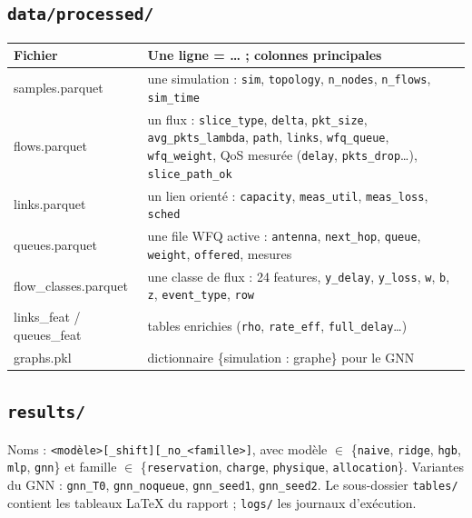 \documentclass[11pt,a4paper]{article}
\newcommand{\f}[1]{\texttt{#1}}
\begin{document}
\subsection{\texttt{data/processed/}}
\begin{tabularx}{\linewidth}{@{}>{\ttfamily}p{4.2cm}X@{}}
\toprule
\normalfont\bfseries Fichier & \bfseries Une ligne = … ; colonnes principales\\
\midrule
samples.parquet & une simulation : \f{sim}, \f{topology}, \f{n\_nodes}, \f{n\_flows}, \f{sim\_time}\\
flows.parquet & un flux : \f{slice\_type}, \f{delta}, \f{pkt\_size}, \f{avg\_pkts\_lambda}, \f{path}, \f{links}, \f{wfq\_queue}, \f{wfq\_weight}, QoS mesurée (\f{delay}, \f{pkts\_drop}…), \f{slice\_path\_ok}\\
links.parquet & un lien orienté : \f{capacity}, \f{meas\_util}, \f{meas\_loss}, \f{sched}\\
queues.parquet & une file WFQ active : \f{antenna}, \f{next\_hop}, \f{queue}, \f{weight}, \f{offered}, mesures\\
flow\_classes.parquet & une classe de flux : 24 features, \f{y\_delay}, \f{y\_loss}, \f{w}, \f{b}, \f{z}, \f{event\_type}, \f{row}\\
links\_feat / queues\_feat & tables enrichies (\f{rho}, \f{rate\_eff}, \f{full\_delay}…)\\
graphs.pkl & dictionnaire \{simulation : graphe\} pour le GNN\\
\bottomrule
\end{tabularx}

\subsection{\texttt{results/}}
Noms : \f{<modèle>[\_shift][\_no\_<famille>]}, avec modèle $\in$ \{\f{naive}, \f{ridge}, \f{hgb}, \f{mlp}, \f{gnn}\} et famille $\in$ \{\f{reservation}, \f{charge}, \f{physique}, \f{allocation}\}. Variantes du GNN : \f{gnn\_T0}, \f{gnn\_noqueue}, \f{gnn\_seed1}, \f{gnn\_seed2}. Le sous-dossier \f{tables/} contient les tableaux LaTeX du rapport ; \f{logs/} les journaux d'exécution.

\end{document}

